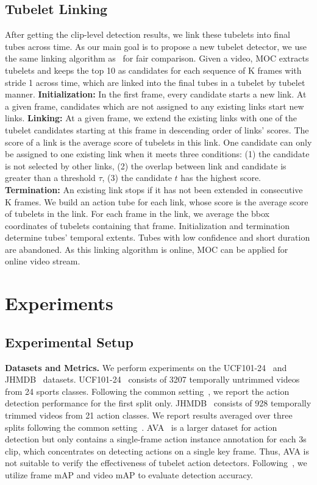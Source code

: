 \documentclass[runningheads]{llncs}
\begin{document}
\subsection{Tubelet Linking}\label{link}
After getting the clip-level detection results, we link these tubelets into final tubes across time. As our main goal is to propose a new tubelet detector, we use the same linking algorithm as~\cite{kalogeiton2017action} for fair comparison. Given a video, MOC extracts tubelets and keeps the top 10 as candidates for each sequence of K frames with stride 1 across time, which are linked into the final tubes in a tubelet by tubelet manner. \textbf{Initialization:} In the first frame, every candidate starts a new link. At a given frame, candidates which are not assigned to any existing links start new links. \textbf{Linking:} At a given frame, we extend the existing links with one of the tubelet candidates starting at this frame in descending order of links' scores. The score of a link is the average score of tubelets in this link. One candidate can only be assigned to one existing link when it meets three conditions: (1) the candidate is not selected by other links, (2) the overlap between link and candidate is greater than a threshold $\tau$, (3) the candidate $t$ has the highest score. \textbf{Termination:} An existing link stops if it has not been extended in consecutive K frames. We build an action tube for each link, whose score is the average score of tubelets in the link. For each frame in the link, we average the bbox coordinates of tubelets containing that frame. Initialization and termination determine tubes' temporal extents. Tubes with low confidence and short duration are abandoned. As this linking algorithm is online, MOC can be applied for online video stream.

\section{Experiments}

\subsection{Experimental Setup}\label{Implementation details}
{\bf Datasets and Metrics.} We perform experiments on the UCF101-24~\cite{UCF101} and JHMDB~\cite{JHMDB} datasets. UCF101-24~\cite{UCF101} consists of 3207 temporally untrimmed videos from 24 sports classes. Following the common setting~\cite{peng2016multi,kalogeiton2017action}, we report the action detection performance for the first split only. JHMDB~\cite{JHMDB} consists of 928 temporally trimmed videos from 21 action classes. We report results averaged over three splits following the common setting~\cite{peng2016multi,kalogeiton2017action}. AVA~\cite{gu2018ava} is a larger dataset for action detection but only contains a single-frame action instance annotation for each 3s clip, which concentrates on detecting actions on a single key frame. Thus, AVA is not suitable to verify the effectiveness of tubelet action detectors. Following~\cite{weinzaepfel2015learning,gkioxari2015finding,kalogeiton2017action}, we utilize frame mAP and video mAP to evaluate detection accuracy.
\end{document}
